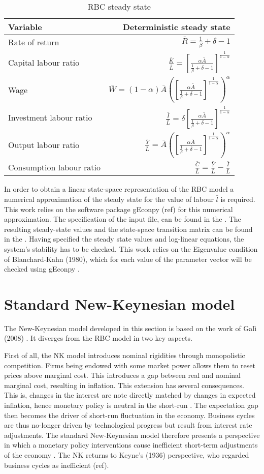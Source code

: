 \documentclass[12pt,a4paper,english]{article} %
\newcommand{\Rss}{\frac{1}{\beta} + \delta - 1}
\newcommand{\Ass}{\bar{A}}
\newcommand{\KLss}{\left[ \frac{\alpha \Ass}{\Rss} \right]^{\frac{1}{1-\alpha}}}
\let\oldsection\section
\renewcommand\section{\clearpage\oldsection}
\begin{document}
	\begin{table}[H]
		\fontsize{9pt}{9pt}\selectfont
		\centering
		\caption{RBC steady state}
		\begin{tabular}{lr}
			\textbf{Variable} & \textbf{Deterministic steady state}\\
			\hline 
			Rate of return & $\bar{R} = \Rss$ \\
			Capital labour ratio & $\frac{\bar{K}}{\bar{L}} = \KLss$ \\
			Wage & $\bar{W} = (1 - \alpha) \Ass \left(\KLss\right)^\alpha$ \\
			Investment labour ratio & $\frac{\bar{I}}{\bar{L}} = \delta \KLss$ \\
			Output labour ratio & $\frac{\bar{Y}}{\bar{L}} = \Ass \left(\KLss\right)^\alpha$ \\
			Consumption labour ratio & $\frac{\bar{C}}{\bar{L}} = \frac{\bar{Y}}{\bar{L}} - \frac{\bar{I}}{\bar{L}}$ \\
		\end{tabular}
	\end{table}

	In order to obtain a linear state-space representation of the RBC model a numerical approximation of the steady state for the value of labour $\bar{l}$ is required. This work relies on the software package gEconpy (ref) for this numerical approximation. The specification of the input file, can be found in the . The resulting steady-state values and the state-space transition matrix can be found in the . 
	Having specified the steady state values and log-linear equations, the system's stability has to be checked. This work relies on the Eigenvalue condition of Blanchard-Kahn (1980), which for each value of the parameter vector will be checked using gEconpy \cite{blanchard_solution_1980}.

	\section{Standard New-Keynesian model} \label{sec:NK}
	The New-Keynesian model developed in this section is based on the work of Galì (2008) \cite{gali_monetary_2008}. It diverges from the RBC model in two key aspects.
	
	First of all, the NK model introduces nominal rigidities through monopolistic competition. Firms being endowed with some market power allows them to reset prices above marginal cost. This introduces a gap between real and nominal marginal cost, resulting in inflation. This extension has several consequences. This is, changes in the interest are note directly matched by changes in expected inflation, hence monetary policy is neutral in the short-run \cite{gali_monetary_2008}. The expectation gap then becomes the driver of short-run fluctuation in the economy. Business cycles are thus no-longer driven by technological progress but result from interest rate adjustments. The standard New-Keynesian model therefore presents a perspective in which a monetary policy interventions cause inefficient short-term adjustments of the economy \cite{gali_monetary_2008}. The NK returns to Keyne's (1936) perspective, who regarded business cycles as inefficient (ref). 
	
\end{document}
